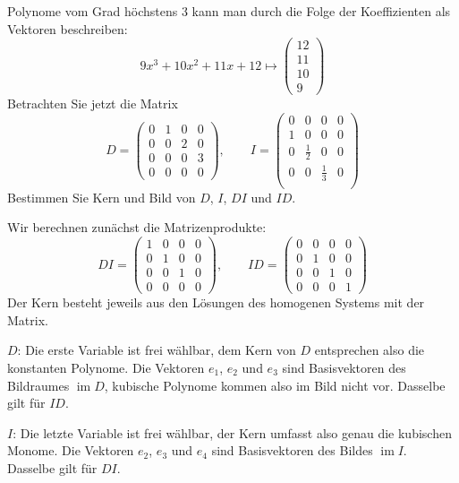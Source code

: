 Polynome vom Grad höchstens 3 kann man durch die Folge der
Koeffizienten als Vektoren beschreiben:
\[
9x^3+10x^2+11x+12\mapsto 
\begin{pmatrix}
12\\11\\10\\9
\end{pmatrix}
\]
Betrachten Sie jetzt die Matrix
\[
D=\begin{pmatrix}
0&1&0&0\\
0&0&2&0\\
0&0&0&3\\
0&0&0&0
\end{pmatrix},
\qquad
I=\begin{pmatrix}
0&0&0&0\\
1&0&0&0\\
0&\frac12&0&0\\
0&0&\frac13&0\\
\end{pmatrix}
\]
Bestimmen Sie Kern und Bild von $D$, $I$, $DI$ und $ID$.

\begin{loesung}
Wir berechnen zunächst die Matrizenprodukte:
\[
DI=\begin{pmatrix}
1&0&0&0\\
0&1&0&0\\
0&0&1&0\\
0&0&0&0
\end{pmatrix},\qquad
ID=\begin{pmatrix}
0&0&0&0\\
0&1&0&0\\
0&0&1&0\\
0&0&0&1
\end{pmatrix}
\]
Der Kern besteht jeweils aus den Lösungen des homogenen Systems mit der
Matrix.

$D$: Die erste Variable ist frei wählbar, dem Kern von $D$ entsprechen also
die konstanten Polynome. Die Vektoren $e_1$, $e_2$ und $e_3$ sind Basisvektoren
des Bildraumes $\operatorname{im}D$, kubische Polynome kommen also im Bild
nicht vor. Dasselbe gilt für $ID$.

$I$: Die letzte Variable ist frei wählbar, der Kern umfasst also
genau die kubischen Monome. Die Vektoren $e_2$, $e_3$ und $e_4$
sind Basisvektoren des Bildes $\operatorname{im}I$. Dasselbe gilt
für $DI$.
\end{loesung}


